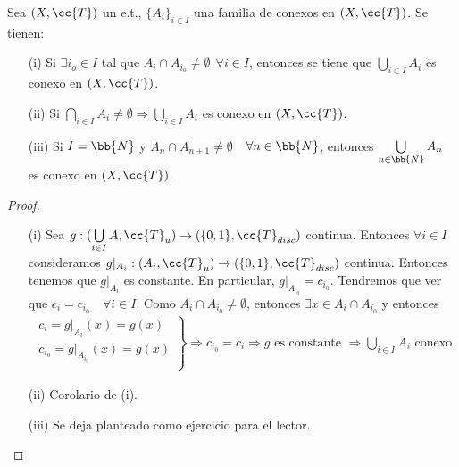\begin{prop}
    Sea $(X, \cc{T})$ un e.t., $\{A_i\}_{i\in I}$ una familia de conexos en $(X, \cc{T})$. Se tienen:
    \begin{enumerate}
        \item[(i)] Si $\exists i_o \in I$ tal que $A_i\cap A_{i_0}\neq \emptyset \ \ \forall i\in I$, entonces se tiene que $\bigcup\limits_{i\in I}A_i$ es conexo en $(X, \cc{T})$.
        \item[(ii)] Si $\bigcap\limits_{i\in I} A_i \neq \emptyset \Rightarrow \bigcup_{i\in I} A_i$ es conexo en $(X, \cc{T})$.
        \item[(iii)] Si $I=\bb{N}$ y $A_n\cap A_{n+1}\neq \emptyset$\ \ $\forall n\in \bb{N}$, entonces $\bigcup\limits_{n\in \bb{N}}A_n$ es conexo en $(X, \cc{T})$.  
    \end{enumerate}
    \begin{proof}\
        \begin{enumerate}
            \item[(i)] Sea $g:(\bigcup\limits_{i\in I}A, \cc{T}_u)\to (\{0,1\}, \cc{T}_{disc})$ continua. Entonces $\forall i \in I$ consideramos $g|_{A_i}:(A_i, \cc{T}_u)\to (\{0,1\}, \cc{T}_{disc})$ continua. Entonces tenemos que $g|_{A_i}$ es constante. En particular, $g|_{A_{i_0}}=c_{i_0}$. Tendremos que ver que $c_i=c_{i_0}$\ \ $\forall i \in I$. 
            Como $A_i\cap A_{i_0}\neq \emptyset$, entonces $\exists x \in A_i \cap A_{i_0}$ y entonces
            \begin{align*}
                \left. 
                \begin{array}{c}
                    c_i=g|_{A_i}(x) = g(x)\\
                    c_{i_0}=g|_{A_{i_0}}(x) = g(x)\\
                \end{array}
                \right\} \Rightarrow c_{i_0}=c_i \Rightarrow g \text{ es constante }\Rightarrow \bigcup\limits_{i\in I}A_i \text{ conexo}
            \end{align*}
            \item[(ii)] Corolario de (i).
            \item[(iii)] Se deja planteado como ejercicio para el lector.
        \end{enumerate}
    \end{proof}
\end{prop}

